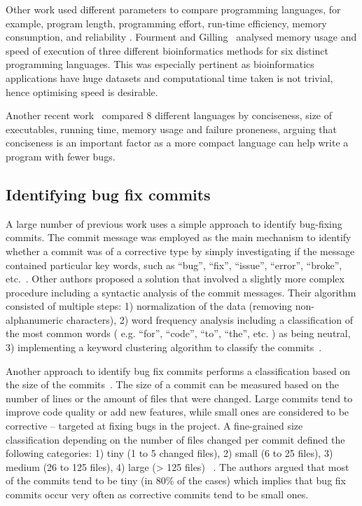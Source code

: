 \documentclass{sig-alternate}
\begin{document}
Other work used different parameters to compare programming languages, for example, program length, programming effort, run-time efficiency, memory consumption, and reliability \cite{Prechelt2000}.  Fourment and Gilling~\cite{Fourment2008} analysed memory usage and speed of execution of three different bioinformatics methods for six distinct programming languages. This was especially pertinent as bioinformatics applications have huge datasets and computational time taken is not trivial, hence optimising speed is desirable.

Another recent work~\cite{Nanz2015} compared 8 different languages by conciseness, size of executables, running time, memory usage and failure proneness, arguing that conciseness is an important factor as a more compact language can help write a program with fewer bugs.

\subsection{Identifying bug fix commits}

A large number of previous work uses a simple approach to identify bug-fixing commits. The commit message was employed as the main mechanism to identify whether a commit was of a corrective type by simply investigating if the message contained particular key words, such as ``bug'', ``fix'', ``issue'', ``error'', ``broke'', etc.~\cite{Hattori2008, Ratzinger2008, Hindle2008}.  Other authors proposed a solution that involved a slightly more complex procedure including a syntactic analysis of the commit messages. Their algorithm consisted of multiple steps: 1) normalization of the data (removing non-alphanumeric characters), 2) word frequency analysis including a classification of the most common words ( e.g. ``for'', ``code'', ``to'', ``the'', etc. ) as being neutral, 3) implementing a keyword clustering algorithm to classify the commits~\cite{Mockus2000}.

Another approach to identify bug fix commits performs a classification based on the size of the commits~\cite{Hattori2008,Mockus2000,Hindle2008}. The size of a commit can be measured based on the number of lines or the amount of files that were changed. Large commits tend to improve code quality or add new features, while small ones are considered to be corrective -- targeted at fixing bugs in the project. A fine-grained size classification depending on the number of files changed per commit defined the following categories: 1) tiny (1 to 5 changed files), 2) small (6 to 25 files), 3) medium (26 to 125 files), 4) large (> 125 files) ~\cite{Hattori2008}. The authors argued that most of the commits tend to be tiny (in 80\% of the cases) which implies that bug fix commits occur very often as corrective commits tend to be small ones.
\end{document}
